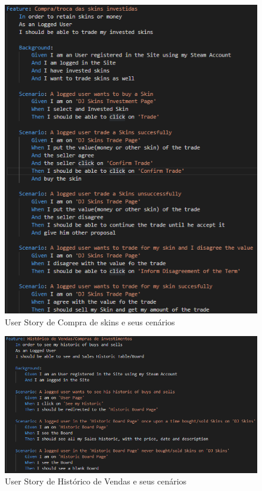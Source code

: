 \documentclass[
    12pt,               %
    openright,          %
    oneside,
    a4paper,            %
    MODELO,             %
    TODO,               %
    english,            %
    brazil              %
    ]{ifsp-spo-inf-ctds} %
\begin{document}
\begin{apendicesenv}
	\begin{figure}[!htb]
		\centering
		\includegraphics[scale=0.9]{Imagens/CompraSkins.png}
		\caption{User Story de Compra de skins e seus cenários}
	\end{figure}

	\begin{figure}[!htb]
		\centering
		\includegraphics[scale=0.9]{Imagens/Historico.png}
		\caption{User Story de Histórico de Vendas e seus cenários}
	\end{figure}


\end{apendicesenv}
\end{document}
